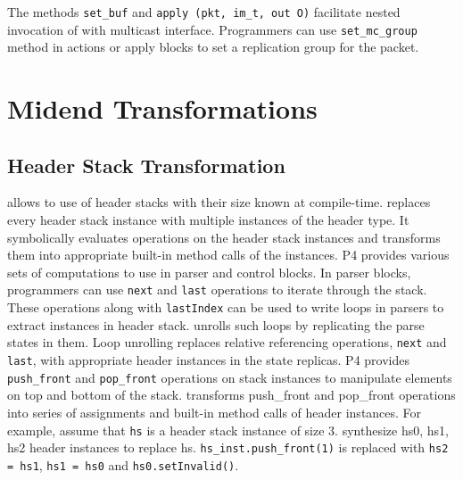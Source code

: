 \documentclass[letterpaper,twocolumn,10pt]{article}
\begin{document}
The methods \texttt{set\_buf} and \texttt{apply (pkt, im\_t, out O)}
facilitate nested invocation of \upackages with multicast interface.
Programmers can use \texttt{set\_mc\_group} method in actions or apply
blocks to set a replication group for the packet.




\section{\ucomp Midend Transformations}

\subsection{Header Stack Transformation}
\label{subsection:header-stack-transformation}
\ulang allows to use of header stacks with their size known at 
compile-time. 
\ucomp replaces every header stack instance with multiple instances of 
the header type. 
It symbolically evaluates operations on the header stack instances and 
transforms them into appropriate built-in method calls of the 
instances.
P4 provides various sets of computations to use in parser and control 
blocks.
In parser blocks, programmers can use \texttt{next} and \texttt{last} 
operations to iterate through the stack.
These operations along with \texttt{lastIndex} can be used to write 
loops in parsers to extract instances in header stack.
\ucomp unrolls such loops by replicating the parse states in them.
Loop unrolling replaces relative referencing operations, \texttt{next} 
and \texttt{last}, with appropriate header instances in the state 
replicas.
P4 provides \texttt{push\_front} and \texttt{pop\_front} operations on 
stack instances to manipulate elements on top and bottom of the stack.
\ucomp transforms push\_front and pop\_front operations into series of 
assignments and built-in method calls of header instances.
For example, assume that \texttt{hs} is a header stack instance of 
size 3. 
\ucomp synthesize hs0, hs1, hs2 header instances to replace hs.
\texttt{hs\_inst.push\_front(1)} is replaced with \texttt{hs2 = hs1}, 
\texttt{hs1 = hs0} and \texttt{hs0.setInvalid()}.
\end{document}
